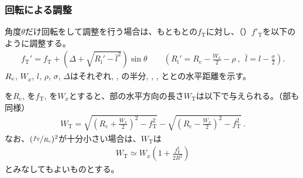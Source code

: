\subsubsection{\Table 回転による調整}
角度$\theta$だけ\Table 回転をして調整を行う場合は、もともとの\TopAlocationLength$f_\mathrm T$に対し、\nameTopAlocationLength（\TopReAlocationLength）$f'_\mathrm T$を以下のように調整する。
\begin{align*}
  f_\mathrm T'
  = f_\mathrm T+\left(\Delta+\sqrt{R_\mathrm i'-\bar l^2}\right)\sin\theta\qquad
    \left(R_\mathrm i' = R_\mathrm c-\frac{W_x}2-\rho~,~~\bar l = l-\frac\sigma2\right).
\end{align*}
$R_\textrm c$, $W_x$, $l$, $\rho$, $\sigma$, $\Delta$はそれぞれ\CenterCurvatureRadius, \ACOD, \JigWidth の半分, \ReceiverPlateRadius, \ReceiverPlateWidth, \ReceiverPlateCenter と\TableCenter との水平距離を示す。



\clearpage
\nameCenterCurvatureRadius を$R_\mathrm c$, \TopAlocationLength を$f_\mathrm T$, \ACOD を$W_x$とすると、\TopEndFace 部の水平方向の長さ$W_\mathrm T$は以下で与えられる。（\BottomEndFace 部も同様）
\begin{align*}
  W_\mathrm T
  = \sqrt{\left(R_\mathrm c+\frac{W_x}2\right)^2-f_\mathrm T^2}
    -\sqrt{\left(R_\mathrm c-\frac{W_x}2\right)^2-f_\mathrm T^2}\ .
\end{align*}
なお、$(\nicefrac{f_\mathrm T}{R_\mathrm c})^2$が十分小さい場合は、$W_\mathrm T$は
\begin{align*}
  W_\mathrm T \simeq W_x\left(1+\frac{f_\mathrm T^2}{2R^2}\right)
\end{align*}
とみなしてもよいものとする。




